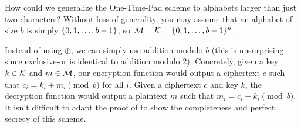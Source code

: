 \documentclass[11pt]{article}
\begin{document}
\begin{question}
    How could we generalize the One-Time-Pad scheme to alphabets larger than just two
    characters? Without loss of generality, you may assume that an alphabet of size
    \(b\)
    is simply \(\{0,1,\ldots, b-1\}\), so \(\mathcal{M} = \mathcal{K} = \{0,1, \ldots,
    b-1\}^n\).
\end{question}
\begin{answer}
    Instead of using \(\oplus\), we can simply use addition modulo \(b\) (this is
    unsurprising since exclusive-or is identical to addition modulo 2). Concretely,
    given a key \(k \in \mathcal{K}\) and \(m \in \mathcal{M}\), our encryption function
    would output a ciphertext \(c\) such that \(c_i = k_i + m_i \pmod{b}\) for all \(i\).
    Given a ciphertext \(c\) and key \(k\), the decryption function would output a
    plaintext \(m\) such that \(m_i = c_i - k_i \pmod{b}\). It isn't difficult to adapt 
    the proof of \label{thm:otp-perfect} to show the completeness and perfect secrecy of
    this scheme.
\end{answer}
\end{document}
